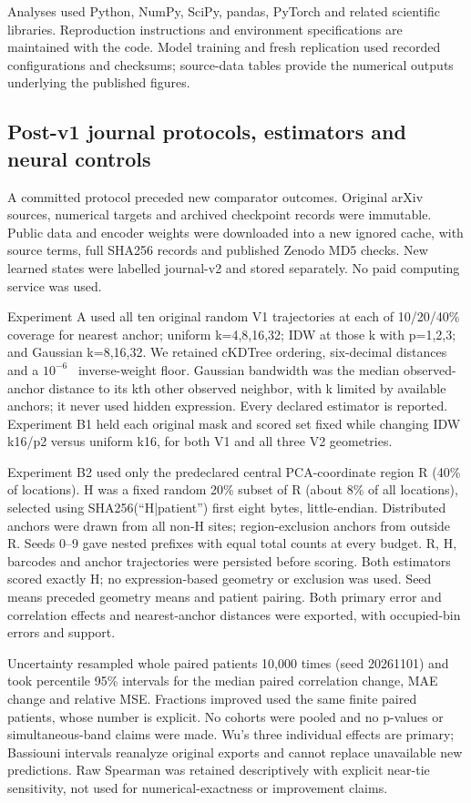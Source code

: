 Analyses used Python, NumPy\cite{harris2020}, SciPy\cite{virtanen2020}, pandas, PyTorch and related scientific libraries. Reproduction instructions and environment specifications are maintained with the code. Model training and fresh replication used recorded configurations and checksums; source-data tables provide the numerical outputs underlying the published figures. 


\subsection{Post-v1 journal protocols, estimators and neural controls}
A committed protocol preceded new comparator outcomes. Original arXiv sources, numerical targets and archived checkpoint records were immutable. Public data and encoder weights were downloaded into a new ignored cache, with source terms, full SHA256 records and published Zenodo MD5 checks. New learned states were labelled journal-v2 and stored separately. No paid computing service was used.

Experiment A used all ten original random V1 trajectories at each of 10/20/40\% coverage for nearest anchor; uniform k=4,8,16,32; IDW at those k with p=1,2,3; and Gaussian k=8,16,32. We retained cKDTree ordering, six-decimal distances and a $10^{-6}$~\um{} inverse-weight floor. Gaussian bandwidth was the median observed-anchor distance to its kth other observed neighbor, with k limited by available anchors; it never used hidden expression. Every declared estimator is reported. Experiment B1 held each original mask and scored set fixed while changing IDW k16/p2 versus uniform k16, for both V1 and all three V2 geometries.

Experiment B2 used only the predeclared central PCA-coordinate region R (40\% of locations). H was a fixed random 20\% subset of R (about 8\% of all locations), selected using SHA256(``H|patient'') first eight bytes, little-endian. Distributed anchors were drawn from all non-H sites; region-exclusion anchors from outside R. Seeds 0--9 gave nested prefixes with equal total counts at every budget. R, H, barcodes and anchor trajectories were persisted before scoring. Both estimators scored exactly H; no expression-based geometry or exclusion was used. Seed means preceded geometry means and patient pairing. Both primary error and correlation effects and nearest-anchor distances were exported, with occupied-bin errors and support.

Uncertainty resampled whole paired patients 10,000 times (seed 20261101) and took percentile 95\% intervals for the median paired correlation change, MAE change and relative MSE. Fractions improved used the same finite paired patients, whose number is explicit. No cohorts were pooled and no p-values or simultaneous-band claims were made. Wu's three individual effects are primary; Bassiouni intervals reanalyze original exports and cannot replace unavailable new predictions. Raw Spearman was retained descriptively with explicit near-tie sensitivity, not used for numerical-exactness or improvement claims.

